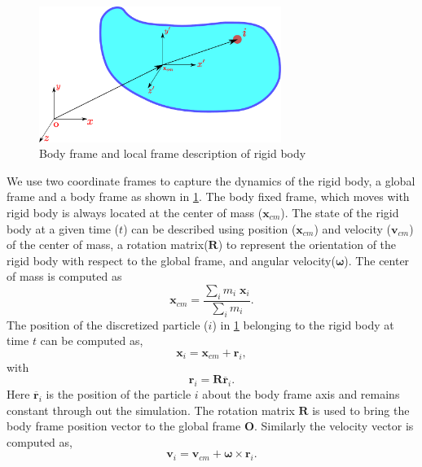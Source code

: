 \documentclass[preprint,12pt]{elsarticle}
\newcommand{\teng}[1]{\ensuremath{\boldsymbol{#1}}}
\newcommand{\ten}[1]{\ensuremath{\mathbf{#1}}}
\begin{document}
\begin{figure}[!htpb]
  \centering
  \includegraphics[width=0.7\textwidth]{images/rigid_body/rigid_body}
  \caption{Body frame and local frame description of rigid body}
  \label{fig:gloabl_body_frame_rb}
\end{figure}
We use two coordinate frames to capture the dynamics of the rigid body, a
global frame and a body frame as shown in
\cref{fig:gloabl_body_frame_rb}. The body fixed frame, which moves with
rigid body is always located at the center of mass ($\ten{x}_{cm}$). The
state of the rigid body at a given time ($t$) can be described using position
($\ten{x}_{cm}$) and velocity ($\ten{v}_{cm}$) of the center of mass, a
rotation matrix($\ten{R}$) to represent the orientation of the rigid body with
respect to the global frame, and angular velocity($\teng{\omega}$). The center
of mass is computed as
\begin{equation}
  \label{eq:rfc:center_of_mass}
  \ten{x}_{cm} = \frac{\sum_i m_i \; \ten{x}_{i} }{\sum_i m_i }.
\end{equation}
The position of the discretized particle ($i$) in
\cref{fig:gloabl_body_frame_rb} belonging to the rigid body at time $t$ can be
computed as,
\begin{equation}
  \label{eq:rfc:rb_particle_pos_update}
  \ten{x}_i = \ten{x}_{cm} + \ten{r}_{i},
\end{equation}
with
\begin{equation}
  \label{eq:rfc:rb_particle_pos_update}
  \ten{r}_i = \ten{R} \overline{\ten{r}}_{i}.
\end{equation}
Here $\overline{\ten{r}}_{i}$ is the position of the particle $i$ about the body
frame axis and remains constant through out the simulation. The rotation matrix
$\ten{R}$ is used to bring the body frame position vector to the global frame
$\ten{O}$. Similarly the velocity vector is computed as,
\begin{equation}
  \label{eq:rfc:rb_particle_vel_update}
  \ten{v}_i = \ten{v}_{cm} + \teng{\omega} \times \ten{r}_{i}.
\end{equation}
\end{document}
